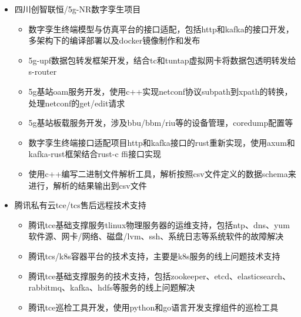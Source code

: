 \begin{itemize}
  \item 四川创智联恒/5g-NR数字孪生项目
  \begin{itemize}
    \item 数字孪生终端模型与仿真平台的接口适配，包括http和kafka的接口开发，多架构下的编译部署以及docker镜像制作和发布
    \item 5g-upf数据包转发框架开发，结合tc和tuntap虚拟网卡将数据包透明转发给s-router
    \item 5g基站oam服务开发，使用c++实现netconf协议subpath到xpath的转换，处理netconf的get/edit请求
    \item 5g基站板载服务开发，涉及bbu/bbm/riu等的设备管理，coredump配置等
    \item 数字孪生终端接口适配项目http和kafka接口的rust重新实现，使用axum和kafka-rust框架结合rust-c ffi接口实现
    \item 使用c++编写二进制文件解析工具，解析按照csv文件定义的数据schema来进行，解析的结果输出到csv文件
  \end{itemize}
\end{itemize}

\begin{itemize}
  \item 腾讯私有云tce/tcs售后远程技术支持
  \begin{itemize}
    \item 腾讯tce基础支撑服务tlinux物理服务器的运维支持，包括ntp、dns、yum软件源、网卡/网络、磁盘/lvm、ssh、系统日志等系统软件的故障解决
    \item 腾讯tcs/k8s容器平台的技术支持，主要是k8s服务的线上问题技术支持
    \item 腾讯tce基础支撑服务的技术支持，包括zookeeper、etcd、elasticsearch、rabbitmq、kafka、hdfs等服务的线上问题解决
    \item 腾讯tce巡检工具开发，使用python和go语言开发支撑组件的巡检工具
  \end{itemize}
\end{itemize}

